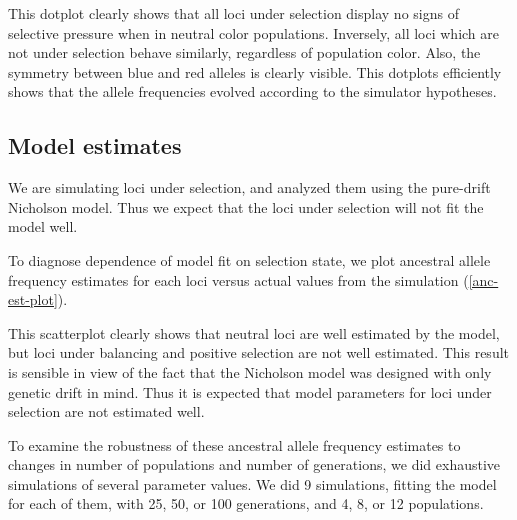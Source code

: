 \documentclass[a4paper,12pt]{article}
\begin{document}

This dotplot clearly shows that all loci under selection display no
signs of selective pressure when in neutral color
populations. Inversely, all loci which are not under selection behave
similarly, regardless of population color. Also, the symmetry between
blue and red alleles is clearly visible. This dotplots efficiently
shows that the allele frequencies evolved according to the simulator
hypotheses.

\subsection{Model estimates}

We are simulating loci under selection, and analyzed them using the
pure-drift Nicholson model. Thus we expect that the loci under
selection will not fit the model well.

To diagnose dependence of model fit on selection state, we plot
ancestral allele frequency estimates for each loci versus actual
values from the simulation (\autoref{anc-est-plot}).


This scatterplot clearly shows that neutral loci are well estimated by
the model, but loci under balancing and positive selection are not
well estimated. This result is sensible in view of the fact that the
Nicholson model was designed with only genetic drift in mind. Thus it
is expected that model parameters for loci under selection are not
estimated well.

To examine the robustness of these ancestral allele frequency
estimates to changes in number of populations and number of
generations, we did exhaustive simulations of several parameter
values. We did 9 simulations, fitting the model for each of them, with
25, 50, or 100 generations, and 4, 8, or 12 populations.
\end{document}
